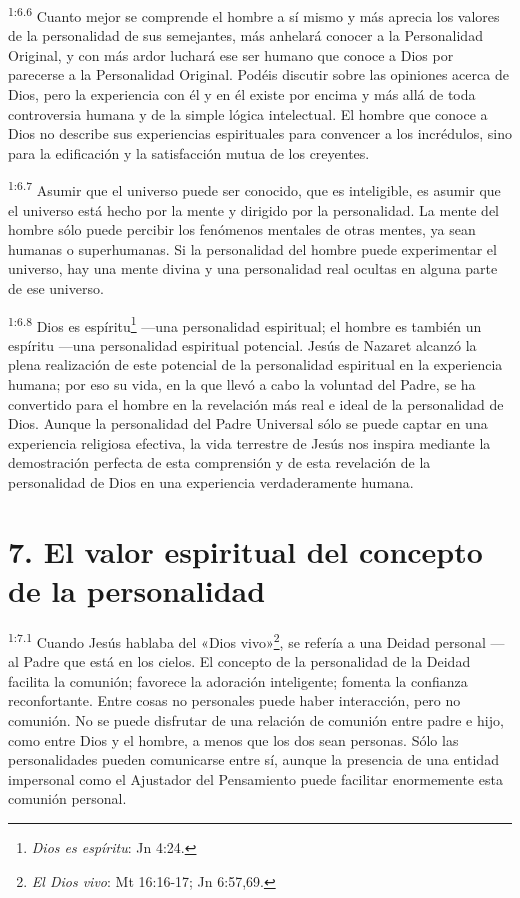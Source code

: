 \par
\textsuperscript{1:6.6} Cuanto mejor se comprende el hombre a sí mismo y más aprecia los valores de la personalidad de sus semejantes, más anhelará conocer a la Personalidad Original, y con más ardor luchará ese ser humano que conoce a Dios por parecerse a la Personalidad Original. Podéis discutir sobre las opiniones acerca de Dios, pero la experiencia con él y en él existe por encima y más allá de toda controversia humana y de la simple lógica intelectual. El hombre que conoce a Dios no describe sus experiencias espirituales para convencer a los incrédulos, sino para la edificación y la satisfacción mutua de los creyentes.

\par
\textsuperscript{1:6.7} Asumir que el universo puede ser conocido, que es inteligible, es asumir que el universo está hecho por la mente y dirigido por la personalidad. La mente del hombre sólo puede percibir los fenómenos mentales de otras mentes, ya sean humanas o superhumanas. Si la personalidad del hombre puede experimentar el universo, hay una mente divina y una personalidad real ocultas en alguna parte de ese universo.

\par
\textsuperscript{1:6.8} Dios es espíritu\footnote{\textit{Dios es espíritu}: Jn 4:24.} ---una personalidad espiritual; el hombre es también un espíritu ---una personalidad espiritual potencial. Jesús de Nazaret alcanzó la plena realización de este potencial de la personalidad espiritual en la experiencia humana; por eso su vida, en la que llevó a cabo la voluntad del Padre, se ha convertido para el hombre en la revelación más real e ideal de la personalidad de Dios. Aunque la personalidad del Padre Universal sólo se puede captar en una experiencia religiosa efectiva, la vida terrestre de Jesús nos inspira mediante la demostración perfecta de esta comprensión y de esta revelación de la personalidad de Dios en una experiencia verdaderamente humana.

\section*{7. El valor espiritual del concepto de la personalidad}
\par
\textsuperscript{1:7.1} Cuando Jesús hablaba del «Dios vivo»\footnote{\textit{El Dios vivo}: Mt 16:16-17; Jn 6:57,69.}, se refería a una Deidad personal ---al Padre que está en los cielos. El concepto de la personalidad de la Deidad facilita la comunión; favorece la adoración inteligente; fomenta la confianza reconfortante. Entre cosas no personales puede haber interacción, pero no comunión. No se puede disfrutar de una relación de comunión entre padre e hijo, como entre Dios y el hombre, a menos que los dos sean personas. Sólo las personalidades pueden comunicarse entre sí, aunque la presencia de una entidad impersonal como el Ajustador del Pensamiento puede facilitar enormemente esta comunión personal.


